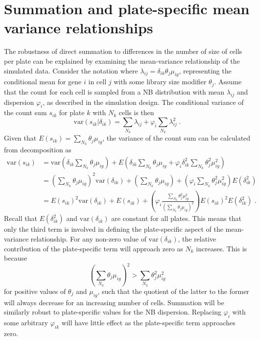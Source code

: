 \documentclass{article}
\begin{document}
\section{Summation and plate-specific mean variance relationships}
The robustness of direct summation to differences in the number of size of cells per plate can be explained by examining the mean-variance relationship of the simulated data.
Consider the notation where $\lambda_{ij} = \delta_{ik}\theta_{j}\mu_{ig}$, representing the conditional mean for gene $i$ in cell $j$ with some library size modifier $\theta_j$.
Assume that the count for each cell is sampled from a NB distribution with mean $\lambda_{ij}$ and dispersion $\varphi_i$, as described in the simulation design.
The conditional variance of the count sum $s_{ik}$ for plate $k$ with $N_k$ cells is then
\[
    \mbox{var}(s_{ik} | \delta_{ik}) = \sum_{N_k} \lambda_{ij}  + \varphi_{i} \sum_{N_k} \lambda_{ij}^2 \;.
\]
Given that $E(s_{ik}) = \sum_{N_k} \theta_j\mu_{ig}$, the variance of the count sum can be calculated from decomposition as
\begin{align*}
    \mbox{var}(s_{ik}) 
    &= \mbox{var}\left(\delta_{ik}\sum_{N_k} \theta_{j}\mu_{ig}\right) + E\left(\delta_{ik}\sum_{N_k}  \theta_{j}\mu_{ig}  + \varphi_{i} \delta_{ik}^2 \sum_{N_k}\theta_{j}^2\mu_{ig}^2\right)\\
    &= \left(\sum_{N_k} \theta_{j}\mu_{ig}\right)^2 \mbox{var}(\delta_{ik}) + \left(\sum_{N_k}  \theta_{j}\mu_{ig}\right) + \left( \varphi_i \sum_{N_k} \theta_j^2\mu_{ig}^2 \right) E(\delta_{ik}^2) \\
    &= E(s_{ik})^2 \mbox{var}(\delta_{ik}) + E(s_{ik}) + \left( \varphi_i \frac{\sum_{N_k} \theta_j^2\mu_{ig}^2}{ (\sum_{N_k} \theta_j\mu_{ig})^2}  \right) E(s_{ik})^2 E(\delta_{ik}^2) \;. 
\end{align*}
Recall that $E(\delta_{ik}^2)$ and $\mbox{var}(\delta_{ik})$ are constant for all plates.
This means that only the third term is involved in defining the plate-specific aspect of the mean-variance relationship.
For any non-zero value of $\mbox{var}(\delta_{ik})$, the relative contribution of the plate-specific term will approach zero as $N_k$ increases.
This is because 
\[
 \left(\sum_{N_k}\theta_j\mu_{ig} \right)^2 > \sum_{N_k} \theta_j^2\mu_{ig}^2
\]
for positive values of $\theta_j$ and $\mu_{ig}$, such that the quotient of the latter to the former will always decrease for an increasing number of cells.
Summation will be similarly robust to plate-specific values for the NB dispersion.
Replacing $\varphi_i$ with some arbitrary $\varphi_{ik}$ will have little effect as the plate-specific term approaches zero.
\end{document}
